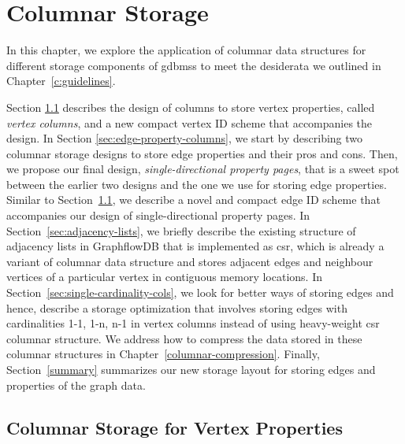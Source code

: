 \chapter{Columnar Storage}
\label{c:columnar-storage}

In this chapter, we explore the application of columnar data structures for different storage components of  \gls{gdbms}s to meet the desiderata we outlined in Chapter~\ref{c:guidelines}. 

Section \ref{sec:vertex-property-columns} describes the design of columns to store vertex properties, called \emph{vertex columns}, and a new compact vertex ID scheme that accompanies the design. In Section \ref{sec:edge-property-columns}, we start by describing two columnar storage designs to store edge properties and their pros and cons. Then, we propose our final design, \emph{single-directional property pages}, that is a sweet spot between the earlier two designs and the one we use for storing edge properties. Similar to Section~\ref{sec:vertex-property-columns}, we describe a novel and compact edge ID scheme that accompanies our design of single-directional property pages. In Section~\ref{sec:adjacency-lists}, we briefly describe the existing structure of adjacency lists in GraphflowDB that is implemented as \gls{csr}, which is already a variant of columnar data structure and stores adjacent edges and neighbour vertices of a particular vertex in contiguous memory locations. In Section~\ref{sec:single-cardinality-cols}, we look for better ways of storing edges and hence, describe a storage optimization that involves storing edges with cardinalities 1-1, 1-n, n-1 in vertex columns instead of using heavy-weight \gls{csr} columnar structure. We address how to compress the data stored in these columnar structures in Chapter~\ref{columnar-compression}. Finally, Section~\ref{summary} summarizes our new storage layout for storing edges and properties of the graph data.

\section{Columnar Storage for Vertex Properties}
\label{sec:vertex-property-columns}

